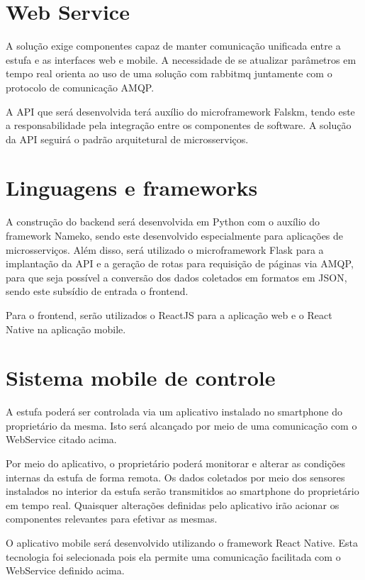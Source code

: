 \section{Web Service}

A solução exige componentes capaz de manter comunicação unificada entre a estufa e as interfaces web e mobile. A necessidade de se atualizar parâmetros em tempo real orienta ao uso de uma solução com rabbitmq juntamente com o protocolo de comunicação AMQP.

A API que será desenvolvida terá auxílio do microframework Falskm, tendo este a responsabilidade pela integração entre os componentes de software. A solução da API seguirá o padrão arquitetural de microsserviços. 

\section{Linguagens e frameworks}

A construção do backend será desenvolvida em Python com o auxílio do framework Nameko, sendo este desenvolvido especialmente para aplicações de microsserviços. Além disso, será utilizado o microframework Flask para a implantação da API e a geração de rotas para requisição de páginas via AMQP, para que seja possível a conversão dos dados coletados em formatos em JSON, sendo este subsídio de entrada o frontend.

Para o frontend, serão utilizados o ReactJS para a aplicação web e o React Native na aplicação mobile. 

\section{Sistema mobile de controle}

A estufa poderá ser controlada via um aplicativo instalado no smartphone do proprietário da mesma. Isto será alcançado por meio de uma comunicação com o WebService citado acima.

Por meio do aplicativo, o proprietário poderá monitorar e alterar as condições internas da estufa de forma remota. Os dados coletados por meio dos sensores instalados no interior da estufa serão transmitidos ao smartphone do proprietário em tempo real. Quaisquer alterações definidas pelo aplicativo irão acionar os componentes relevantes para efetivar as mesmas.

O aplicativo mobile será desenvolvido utilizando o framework React Native. Esta tecnologia foi selecionada pois ela permite uma comunicação facilitada com o WebService definido acima.

